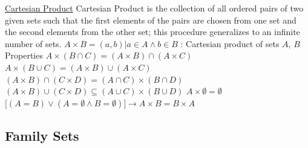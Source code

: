 \documentclass[12pt]{article}
\begin{document}
\begin{flushleft}
	\uline{Cartesian Product} \linebreak 
   Cartesian Product is the collection of all ordered pairs of two given sets such that the first elements of the pairs are chosen from one set and the second elements from the other set; this procedure generalizes to an infinite number of sets. \linebreak 
   \textbullet \quad $ A\times B = { (a,b) | a \in A \land b \in B} $  :  Cartesian product of sets $A$, $B$ \linebreak   
   Properties \linebreak 
   \textbullet \quad $ A \times (B \cap C) = (A \times B) \cap (A \times C) $ \linebreak
   \textbullet \quad $ A \times (B \cup C) = (A \times B) \cup (A \times C) $ \linebreak
   \textbullet \quad $ (A \times B) \cap (C \times D) = (A \cap C) \times (B \cap D) $ \linebreak
   \textbullet \quad $ (A \times B) \cup (C \times D) \subseteq (A \cup  C) \times (B \cup D) $ \linebreak
   \textbullet \quad $ A \times \emptyset = \emptyset $ \linebreak 
   \textbullet \quad $\displaystyle \big[(A = B) \lor (A = \emptyset \land B = \emptyset) \big] \rightarrow A \times B = B \times A $ \linebreak
   
   \subsection{Family Sets} 
   

\end{flushleft}
\end{document}
